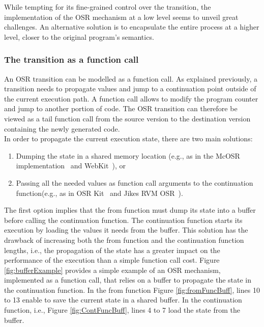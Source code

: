 While tempting for its fine-grained control over the transition, the implementation of the OSR mechanism at a low level seems to unveil great challenges.
An alternative solution is to encapsulate the entire process at a higher level, closer to the original program's semantics.\\

\subsubsection{The transition as a function call}
An OSR transition can be modelled as a function call.
As explained previously, a transition needs to propagate values and jump to a continuation point outside of the current execution path.
A function call allows to modify the program counter and jump to another portion of code.
The OSR transition can therefore be viewed as a tail function call from the source version to the destination version containing the newly generated code.\\

In order to propagate the current execution state, there are two main solutions: 
\begin{enumerate}
    \item Dumping the state in a shared memory location (e.g., as in the McOSR implementation~\cite{lameed2013modular} and WebKit~\cite{WebKitURL}), or
    \item Passing all the needed values as function call arguments to the continuation function(e.g., as in OSR Kit~\cite{OSRKit} and Jikes RVM OSR~\cite{fink2003design}).
\end{enumerate}

The first option implies that the from function must dump its state into a buffer before calling the continuation function.
The continuation function starts its execution by loading the values it needs from the buffer.
This solution has the drawback of increasing both the from function and the continuation function lengths, i.e., the propagation of the state has a greater impact on the performance of the execution than a simple function call cost.
Figure \ref{fig:bufferExample} provides a simple example of an OSR mechanism, implemented as a function call, that relies on a buffer to propagate the state in the continuation function.
In the from function Figure \ref{fig:fromFuncBuff}, lines 10 to 13 enable to save the current state in a shared buffer.
In the continuation function, i.e., Figure \ref{fig:ContFuncBuff}, lines 4 to 7 load the state from the buffer.\\

